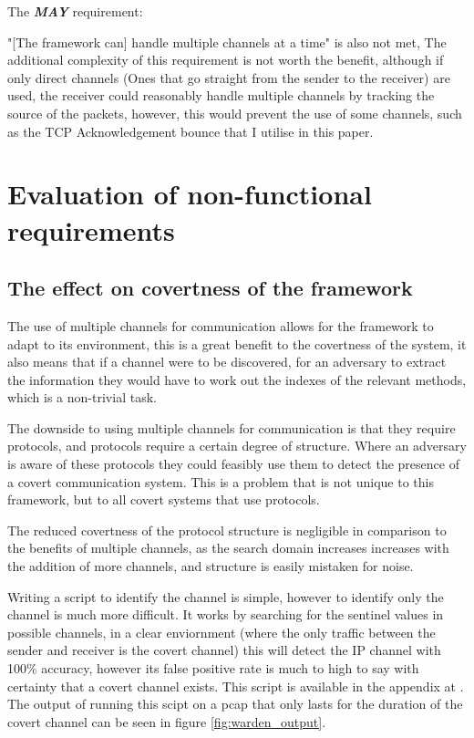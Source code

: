The \textit{\textbf{MAY}} requirement:

"[The framework can] handle multiple channels at a time" is also not met, The additional complexity of this requirement is not worth the benefit, although if only direct channels (Ones that go straight from the sender to the receiver) are used, the receiver could reasonably handle multiple channels by tracking the source of the packets, however, this would prevent the use of some channels, such as the TCP Acknowledgement bounce that I utilise in this paper.

\section{Evaluation of non-functional requirements}

\subsection{The effect on covertness of the framework}

The use of multiple channels for communication allows for the framework to adapt to its environment, this is a great benefit to the covertness of the system, it also means that if a channel were to be discovered, for an adversary to extract the information they would have to work out the indexes of the relevant methods, which is a non-trivial task. 

The downside to using multiple channels for communication is that they require protocols, and protocols require a certain degree of structure. Where an adversary is aware of these protocols they could feasibly use them to detect the presence of a covert communication system. This is a problem that is not unique to this framework, but to all covert systems that use protocols.

The reduced covertness of the protocol structure is negligible in comparison to the benefits of multiple channels, as the search domain increases increases with the addition of more channels, and structure is easily mistaken for noise.

Writing a script to identify the channel is simple, however to identify only the channel is much more difficult. It works by searching for the sentinel values in possible channels, in a clear enviornment (where the only traffic between the sender and receiver is the covert channel) this will detect the IP channel with 100\% accuracy, however its false positive rate is much to high to say with certainty that a covert channel exists. This script is available in the appendix at . The output of running this scipt on a pcap that only lasts for the duration of the covert channel can be seen in figure \ref{fig:warden_output}.

